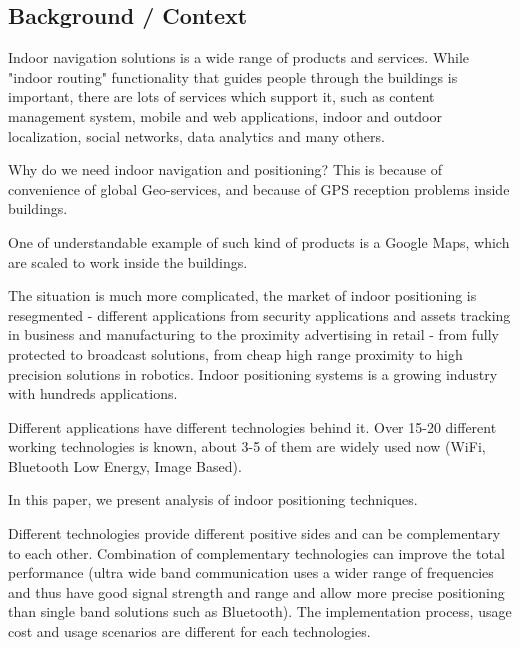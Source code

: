 

\subsection{Background / Context}

\cite{Infsoft_wp}

%
%
%
%

Indoor navigation solutions is a wide range of products and services. While "indoor routing" functionality that guides people through the buildings is important, there are lots of services which support it, such as content management system, mobile and web applications, indoor and outdoor localization, social networks, data analytics and many others.

Why do we need indoor navigation and positioning? This is because of convenience of global Geo-services, and because of GPS reception problems inside buildings.

One of understandable example of such kind of products is a Google Maps, which are scaled to work inside the buildings.

The situation is much more complicated, the market of indoor positioning is resegmented - different applications from security applications and assets tracking in business and manufacturing to the proximity advertising in retail - from fully protected to broadcast solutions, from cheap high range proximity to high precision solutions in robotics. Indoor positioning systems is a growing industry with hundreds applications.

Different applications have different technologies behind it. Over 15-20 different working technologies is known, about 3-5 of them are widely used now (WiFi, Bluetooth Low Energy, Image Based).

\cite{Infsoft_wp}

%

In this paper, we present analysis of indoor positioning techniques.

Different technologies provide different positive sides and can be complementary to each other. Combination of complementary technologies can improve the total performance (ultra wide band communication uses a wider range of frequencies and thus have good signal strength and range and allow more precise positioning than single band solutions such as Bluetooth). The implementation process, usage cost and usage scenarios are different for each technologies.

